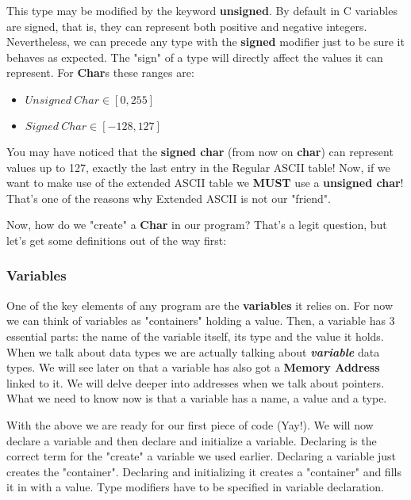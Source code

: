 \documentclass[12pt]{book}
\begin{document}
This type may be modified by the keyword \textbf{unsigned}. By default in C variables are signed, that is, they can represent both positive and negative integers. Nevertheless, we can precede any type with the \textbf{signed} modifier just to be sure it behaves as expected. The "sign" of a type will directly affect the values it can represent. For \textbf{Char}s these ranges are:
\begin{itemize}
  \item $Unsigned\ Char \in [0, 255]$
  \item $Signed\ Char \in [-128, 127]$
\end{itemize}

You may have noticed that the \textbf{signed char} (from now on \textbf{char}) can represent values up to 127, exactly the last entry in the Regular ASCII table! Now, if we want to make use of the extended ASCII table we \textbf{MUST} use a \textbf{unsigned char}! That's one of the reasons why Extended ASCII is not our "friend".

Now, how do we "create" a \textbf{Char} in our program? That's a legit question, but let's get some definitions out of the way first:

\subsubsection{Variables} %

One of the key elements of any program are the \textbf{variables} it relies on. For now we can think of variables as "containers" holding a value. Then, a variable has 3 essential parts: the name of the variable itself, its type and the value it holds. When we talk about data types we are actually talking about \textit{\textbf{variable}} data types. We will see later on that a variable has also got a \textbf{Memory Address} linked to it. We will delve deeper into addresses when we talk about pointers. What we need to know now is that a variable has a name, a value and a type.


With the above we are ready for our first piece of code (Yay!). We will now declare a variable and then declare and initialize a variable. Declaring is the correct term for the "create" a variable we used earlier. Declaring a variable just creates the "container". Declaring and initializing it creates a "container" and fills it in with a value. Type modifiers have to be specified in variable declaration.
\end{document}
